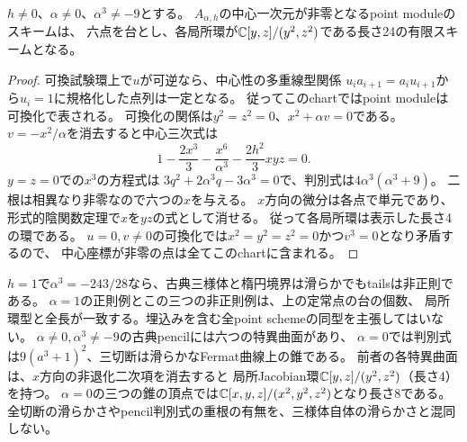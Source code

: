 \begin{proposition}[正則性を区別しない定常点の粗い局所データ]
$h\ne0$、$\alpha\ne0$、$\alpha^3\ne-9$とする。
$A_{\alpha,h}$の中心一次元が非零となるpoint moduleのスキームは、
六点を台とし、各局所環が$\mathbb C[y,z]/(y^2,z^2)$である長さ24の有限スキームとなる。
\end{proposition}
\begin{proof}
可換試験環上で$u$が可逆なら、中心性の多重線型関係
$u_i a_{i+1}=a_i u_{i+1}$から$u_i=1$に規格化した点列は一定となる。
従ってこのchartではpoint moduleは可換化で表される。
可換化の関係は$y^2=z^2=0$、$x^2+\alpha v=0$である。
$v=-x^2/\alpha$を消去すると中心三次式は
\[
 1-\frac{2x^3}{3}-\frac{x^6}{\alpha^3}-\frac{2h^2}{3}xyz=0.
\]
$y=z=0$での$x^3$の方程式は
$3q^2+2\alpha^3q-3\alpha^3=0$で、判別式は$4\alpha^3(\alpha^3+9)$。
二根は相異なり非零なので六つの$x$を与える。
$x$方向の微分は各点で単元であり、形式的陰関数定理で$x$を$yz$の式として消せる。
従って各局所環は表示した長さ4の環である。
$u=0,v\ne0$の可換化では$x^2=y^2=z^2=0$かつ$v^3=0$となり矛盾するので、
中心座標が非零の点は全てこのchartに含まれる。
\end{proof}
\begin{remark}
$h=1$で$\alpha^3=-243/28$なら、古典三様体と楕円境界は滑らかでもtailsは非正則である。
$\alpha=1$の正則例とこの三つの非正則例は、上の定常点の台の個数、
局所環型と全長が一致する。埋込みを含む全point schemeの同型を主張してはいない。
$\alpha\ne0,\alpha^3\ne-9$の古典pencilには六つの特異曲面があり、
$\alpha=0$では判別式は$9(a^3+1)^2$、三切断は滑らかなFermat曲線上の錐である。
前者の各特異曲面は、$x$方向の非退化二次項を消去すると
局所Jacobian環$\mathbb C[y,z]/(y^2,z^2)$（長さ4）を持つ。
$\alpha=0$の三つの錐の頂点では$\mathbb C[x,y,z]/(x^2,y^2,z^2)$となり長さ8である。
全切断の滑らかさやpencil判別式の重根の有無を、三様体自体の滑らかさと混同しない。
\end{remark}
